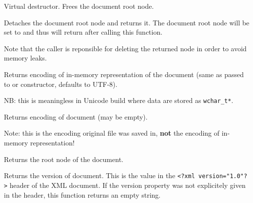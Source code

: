 Virtual destructor. Frees the document root node.



\label{wxxmldocumentdetachroot}


Detaches the document root node and returns it. The document root node will be set to \NULL
and thus  will return \false after calling this function.

Note that the caller is reponsible for deleting the returned node in order to avoid memory leaks.



\label{wxxmldocumentgetencoding}


Returns encoding of in-memory representation of the document
(same as passed to  or constructor, defaults to UTF-8).

NB: this is meaningless in Unicode build where data are stored as {\tt wchar\_t*}.



\label{wxxmldocumentgetfileencoding}


Returns encoding of document (may be empty).

Note: this is the encoding original file was saved in, {\bf not} the
encoding of in-memory representation!



\label{wxxmldocumentgetroot}


Returns the root node of the document.



\label{wxxmldocumentgetversion}


Returns the version of document.
This is the value in the {\tt <?xml version="1.0"?>} header of the XML document.
If the version property was not explicitely given in the header, this function
returns an empty string.



\label{wxxmldocumentisok}

